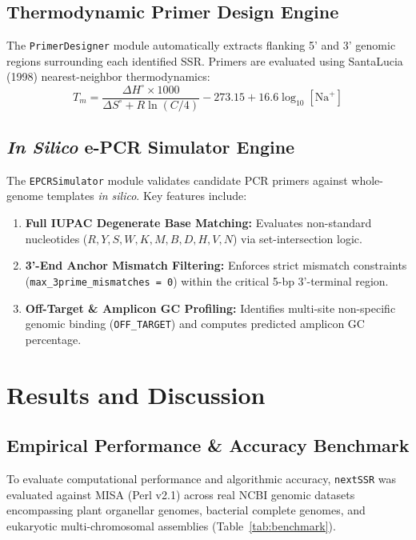 \documentclass[fullpage]{article}
\begin{document}
\subsection*{Thermodynamic Primer Design Engine}
The \texttt{PrimerDesigner} module automatically extracts flanking 5' and 3' genomic regions surrounding each identified SSR. Primers are evaluated using SantaLucia (1998) nearest-neighbor thermodynamics:
\begin{equation}
T_m = \frac{\Delta H^\circ \times 1000}{\Delta S^\circ + R \ln(C/4)} - 273.15 + 16.6 \log_{10}[\text{Na}^+]
\end{equation}

\subsection*{\textit{In Silico} e-PCR Simulator Engine}
The \texttt{EPCRSimulator} module validates candidate PCR primers against whole-genome templates \textit{in silico}. Key features include:
\begin{enumerate}
    \item \textbf{Full IUPAC Degenerate Base Matching:} Evaluates non-standard nucleotides ($R, Y, S, W, K, M, B, D, H, V, N$) via set-intersection logic.
    \item \textbf{3'-End Anchor Mismatch Filtering:} Enforces strict mismatch constraints (\texttt{max\_3prime\_mismatches = 0}) within the critical 5-bp 3'-terminal region.
    \item \textbf{Off-Target \& Amplicon GC Profiling:} Identifies multi-site non-specific genomic binding (\texttt{OFF\_TARGET}) and computes predicted amplicon GC percentage.
\end{enumerate}

\section*{Results and Discussion}
\subsection*{Empirical Performance \& Accuracy Benchmark}
To evaluate computational performance and algorithmic accuracy, \texttt{nextSSR} was evaluated against MISA (Perl v2.1) across real NCBI genomic datasets encompassing plant organellar genomes, bacterial complete genomes, and eukaryotic multi-chromosomal assemblies (Table~\ref{tab:benchmark}).
\end{document}
